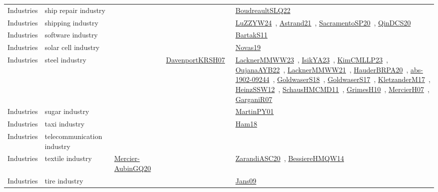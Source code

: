 {\begin{longtable}{lp{3cm}>{\raggedright\arraybackslash}p{6cm}>{\raggedright\arraybackslash}p{6cm}>{\raggedright\arraybackslash}p{8cm}}
Industries & ship repair industry &  &  & \href{../works/BoudreaultSLQ22.pdf}{BoudreaultSLQ22}~\cite{BoudreaultSLQ22}\\
Industries & shipping industry &  &  & \href{../works/LuZZYW24.pdf}{LuZZYW24}~\cite{LuZZYW24}, \href{../works/Astrand21.pdf}{Astrand21}~\cite{Astrand21}, \href{../works/SacramentoSP20.pdf}{SacramentoSP20}~\cite{SacramentoSP20}, \href{../works/QinDCS20.pdf}{QinDCS20}~\cite{QinDCS20}\\
Industries & software industry &  &  & \href{../works/BartakS11.pdf}{BartakS11}~\cite{BartakS11}\\
Industries & solar cell industry &  &  & \href{../works/Novas19.pdf}{Novas19}~\cite{Novas19}\\
Industries & steel industry &  & \href{../works/DavenportKRSH07.pdf}{DavenportKRSH07}~\cite{DavenportKRSH07} & \href{../works/LacknerMMWW23.pdf}{LacknerMMWW23}~\cite{LacknerMMWW23}, \href{../works/IsikYA23.pdf}{IsikYA23}~\cite{IsikYA23}, \href{../works/KimCMLLP23.pdf}{KimCMLLP23}~\cite{KimCMLLP23}, \href{../works/OujanaAYB22.pdf}{OujanaAYB22}~\cite{OujanaAYB22}, \href{../works/LacknerMMWW21.pdf}{LacknerMMWW21}~\cite{LacknerMMWW21}, \href{../works/HauderBRPA20.pdf}{HauderBRPA20}~\cite{HauderBRPA20}, \href{../works/abs-1902-09244.pdf}{abs-1902-09244}~\cite{abs-1902-09244}, \href{../works/GoldwaserS18.pdf}{GoldwaserS18}~\cite{GoldwaserS18}, \href{../works/GoldwaserS17.pdf}{GoldwaserS17}~\cite{GoldwaserS17}, \href{../works/KletzanderM17.pdf}{KletzanderM17}~\cite{KletzanderM17}, \href{../works/HeinzSSW12.pdf}{HeinzSSW12}~\cite{HeinzSSW12}, \href{../works/SchausHMCMD11.pdf}{SchausHMCMD11}~\cite{SchausHMCMD11}, \href{../works/GrimesH10.pdf}{GrimesH10}~\cite{GrimesH10}, \href{../works/MercierH07.pdf}{MercierH07}~\cite{MercierH07}, \href{../works/GarganiR07.pdf}{GarganiR07}~\cite{GarganiR07}\\
Industries & sugar industry &  &  & \href{../works/MartinPY01.pdf}{MartinPY01}~\cite{MartinPY01}\\
Industries & taxi industry &  &  & \href{../works/Ham18.pdf}{Ham18}~\cite{Ham18}\\
Industries & telecommunication industry &  &  & \\
Industries & textile industry & \href{../works/Mercier-AubinGQ20.pdf}{Mercier-AubinGQ20}~\cite{Mercier-AubinGQ20} &  & \href{../works/ZarandiASC20.pdf}{ZarandiASC20}~\cite{ZarandiASC20}, \href{../works/BessiereHMQW14.pdf}{BessiereHMQW14}~\cite{BessiereHMQW14}\\
Industries & tire industry &  &  & \href{../works/Jans09.pdf}{Jans09}~\cite{Jans09}\\

\end{longtable}}
